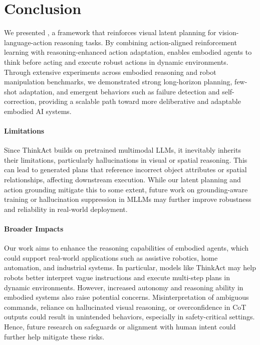 \section{Conclusion}
\label{sec:conclusion}

We presented \textit{\ours{}}, a framework that reinforces visual latent planning for vision-language-action reasoning tasks. By combining action-aligned reinforcement learning with reasoning-enhanced action adaptation, \ours{} enables embodied agents to think before acting and execute robust actions in dynamic environments. Through extensive experiments across embodied reasoning and robot manipulation benchmarks, we demonstrated strong long-horizon planning, few-shot adaptation, and emergent behaviors such as failure detection and self-correction, providing a scalable path toward more deliberative and adaptable embodied AI systems.

\paragraph{Limitations}
Since ThinkAct builds on pretrained multimodal LLMs, it inevitably inherits their limitations, particularly hallucinations in visual or spatial reasoning. This can lead to generated plans that reference incorrect object attributes or spatial relationships, affecting downstream execution. While our latent planning and action grounding mitigate this to some extent, future work on grounding-aware training or hallucination suppression in MLLMs may further improve robustness and reliability in real-world deployment.

\paragraph{Broader Impacts}
Our work aims to enhance the reasoning capabilities of embodied agents, which could support real-world applications such as assistive robotics, home automation, and industrial systems. In particular, models like ThinkAct may help robots better interpret vague instructions and execute multi-step plans in dynamic environments. However, increased autonomy and reasoning ability in embodied systems also raise potential concerns. Misinterpretation of ambiguous commands, reliance on hallucinated visual reasoning, or overconfidence in CoT outputs could result in unintended behaviors, especially in safety-critical settings. Hence, future research on safeguards or alignment with human intent could further help mitigate these risks.
